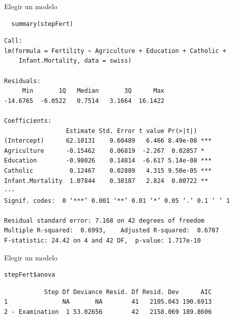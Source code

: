 \documentclass[xcolor={usenames,svgnames,dvipsnames}]{beamer}
\begin{document}
\begin{frame}[fragile,label=sec-3-12]{Elegir un modelo}
 \lstset{language=R,label= ,caption= ,numbers=none}
\begin{lstlisting}
  summary(stepFert)
\end{lstlisting}

\begin{verbatim}
Call:
lm(formula = Fertility ~ Agriculture + Education + Catholic + 
    Infant.Mortality, data = swiss)

Residuals:
     Min       1Q   Median       3Q      Max 
-14.6765  -6.0522   0.7514   3.1664  16.1422 

Coefficients:
                 Estimate Std. Error t value Pr(>|t|)    
(Intercept)      62.10131    9.60489   6.466 8.49e-08 ***
Agriculture      -0.15462    0.06819  -2.267  0.02857 *  
Education        -0.98026    0.14814  -6.617 5.14e-08 ***
Catholic          0.12467    0.02889   4.315 9.50e-05 ***
Infant.Mortality  1.07844    0.38187   2.824  0.00722 ** 
---
Signif. codes:  0 ‘***’ 0.001 ‘**’ 0.01 ‘*’ 0.05 ‘.’ 0.1 ‘ ’ 1

Residual standard error: 7.168 on 42 degrees of freedom
Multiple R-squared:  0.6993,	Adjusted R-squared:  0.6707 
F-statistic: 24.42 on 4 and 42 DF,  p-value: 1.717e-10
\end{verbatim}
\end{frame}

\begin{frame}[fragile,label=sec-3-13]{Elegir un modelo}
 \lstset{language=R,label= ,caption= ,numbers=none}
\begin{lstlisting}
stepFert$anova
\end{lstlisting}

\begin{verbatim}
           Step Df Deviance Resid. Df Resid. Dev      AIC
1               NA       NA        41   2105.043 190.6913
2 - Examination  1 53.02656        42   2158.069 189.8606
\end{verbatim}
\end{frame}
\end{document}
